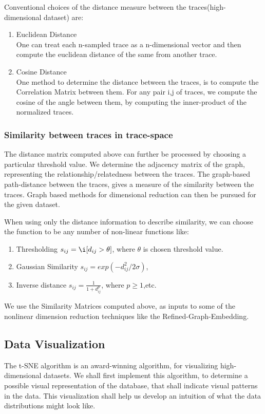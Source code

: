 \documentclass[10pt]{article}
\begin{document}
Conventional choices of the distance measure between the traces(high-dimensional dataset) are:
\begin{enumerate}
\item Euclidean Distance\\
One can treat each n-sampled trace as a n-dimensional vector and then compute the euclidean distance of the same from another trace.
\item Cosine Distance\\
One method to determine the distance between the traces, is to compute the Correlation Matrix between them. For any pair i,j of traces, we compute the cosine of the angle between them, by computing the inner-product of the normalized traces. 
\end{enumerate}

\subsubsection{Similarity between traces in trace-space}
The distance matrix computed above can further be processed by choosing a particular threshold value. We determine the adjacency matrix of the graph, representing the relationship/relatedness between the traces. The graph-based path-distance between the traces, gives a measure of the similarity between the traces. Graph based methods for dimensional reduction can then be pursued for the given dataset. 

When using only the distance information to describe similarity, we can choose the function to be any number of non-linear functions like:
\begin{enumerate}
\item Thresholding $s_{ij} = \i[d_{ij} > \theta]$, where $\theta$ is chosen threshold value.
\item Gaussian Similarity $s_{ij} = exp(-d_{ij}^2 / 2\sigma)$,
\item Inverse distance $s_{ij} = \frac{1}{1 + d_{ij}^p}$, where $p \geq 1$,etc.
\end{enumerate}
We use the Similarity Matrices computed above, as inputs to some of the nonlinear dimension reduction techniques like the Refined-Graph-Embedding.

\subsection{Data Visualization}
The t-SNE algorithm \cite{tSNEdataViz} is an award-winning algorithm, for visualizing high-dimensional datasets. We shall first implement this algorithm, to determine a possible visual representation of the database, that shall indicate visual patterns in the data. This visualization shall help us develop an intuition of what the data distributions might look like. 
\end{document}
